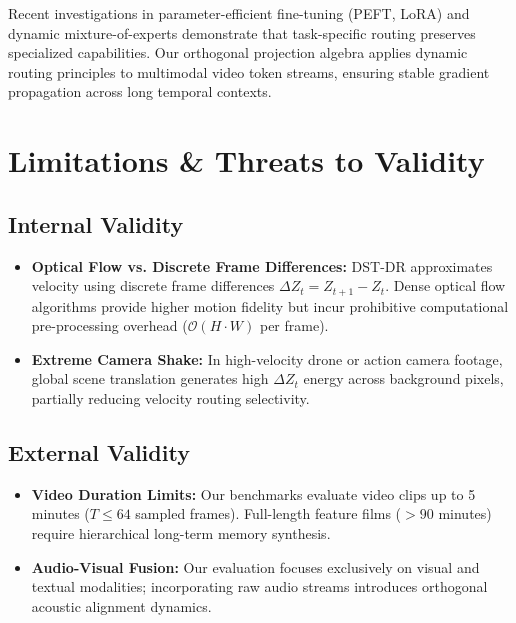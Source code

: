 \documentclass[10pt,journal,compsoc,twocolumn]{IEEEtran}
\begin{document}
Recent investigations in parameter-efficient fine-tuning (PEFT, LoRA) and dynamic mixture-of-experts \cite{arxiv_2305_18290,arxiv_2412_06333} demonstrate that task-specific routing preserves specialized capabilities. Our orthogonal projection algebra applies dynamic routing principles to multimodal video token streams, ensuring stable gradient propagation across long temporal contexts.




\section{Limitations \& Threats to Validity}



\subsection{Internal Validity}

\begin{itemize}
  \item \textbf{Optical Flow vs. Discrete Frame Differences:} DST-DR approximates velocity using discrete frame differences $\Delta Z_t = Z_{t+1} - Z_t$. Dense optical flow algorithms provide higher motion fidelity but incur prohibitive computational pre-processing overhead ($\mathcal{O}(H \cdot W)$ per frame).
  \item \textbf{Extreme Camera Shake:} In high-velocity drone or action camera footage, global scene translation generates high $\Delta Z_t$ energy across background pixels, partially reducing velocity routing selectivity.
\end{itemize}


\subsection{External Validity}

\begin{itemize}
  \item \textbf{Video Duration Limits:} Our benchmarks evaluate video clips up to 5 minutes ($T \le 64$ sampled frames). Full-length feature films ($>90$ minutes) require hierarchical long-term memory synthesis.
  \item \textbf{Audio-Visual Fusion:} Our evaluation focuses exclusively on visual and textual modalities; incorporating raw audio streams introduces orthogonal acoustic alignment dynamics.
\end{itemize}
\end{document}
